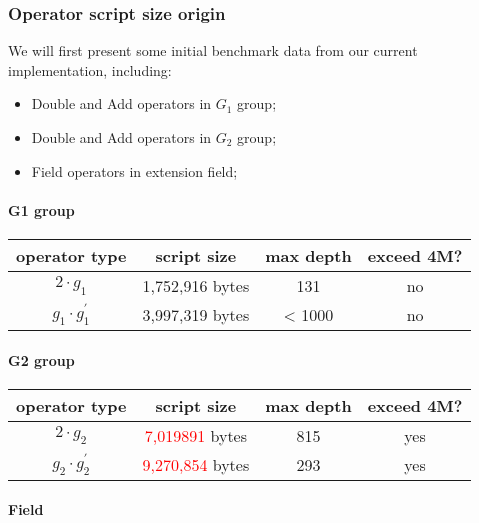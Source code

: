 \subsubsection{Operator script size origin}

We will first present some initial benchmark data from our current implementation, including:

\begin{itemize}
    \item Double and Add operators in $G_1$ group;
    \item Double and Add operators in $G_2$ group;
    \item Field operators in extension field;
\end{itemize}

\paragraph*{G1 group}

\begin{center}
\begin{tabular}{|c|c|c|c|} \hline
operator type & script size & max depth & exceed 4M? \\ \hline
$2 \cdot g_1$ & 1,752,916 bytes & 131 & no  \\ \hline
$g_1 \cdot g_1^{'}$ & 3,997,319 bytes &	< 1000 & no \\ \hline
\end{tabular}
\end{center}

\paragraph*{G2 group}

\begin{center}
\begin{tabular}{|c|c|c|c|} \hline
operator type & script size & max depth & exceed 4M? \\ \hline
$2 \cdot g_2$ & \textcolor{red}{7,019891} bytes & 815 & yes  \\ \hline
$g_2 \cdot g_2^{'}$ & \textcolor{red}{9,270,854} bytes &	293 & yes \\ \hline
\end{tabular}
\end{center}

\paragraph*{Field}

